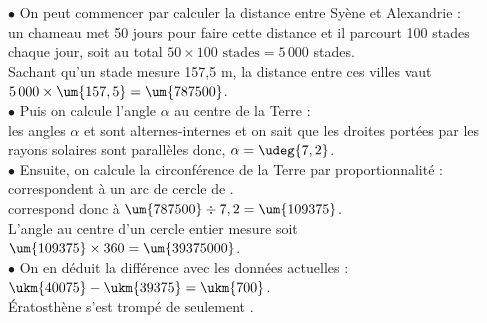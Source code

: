 $\bullet$ On peut commencer par calculer la distance entre Syène et Alexandrie : \\
un chameau met 50 jours pour faire cette distance et il parcourt 100 stades chaque jour, soit au total $50\times100 \text{ stades} =5\,000$ stades. \\
Sachant qu'un stade mesure 157,5 m, la distance entre ces villes vaut $5\,000\times\um{157,5} =\um{787500}$. \\ \smallskip
$\bullet$ Puis on calcule l'angle $\alpha$ au centre de la Terre : \\
les angles $\alpha$ et  sont alternes-internes et on sait que les droites portées par les rayons solaires sont parallèles donc, $\alpha =\udeg{7,2}$. \\ \smallskip
$\bullet$ Ensuite, on calcule la circonférence de la Terre par proportionnalité : \\
 correspondent à un arc de cercle de . \\
 correspond donc à $\um{787500}\div7,2 =\um{109375}$. \\
L'angle au centre d'un cercle entier mesure  soit $\um{109375}\times360 =\um{39375000}$. \\ \smallskip
$\bullet$ On en déduit la différence avec les données actuelles : $\ukm{40075}-\ukm{39375} =\ukm{700}$. \\
{\blue Ératosthène s'est trompé de  \og seulement \fg.}

